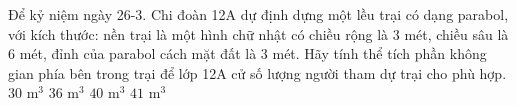 \begin{ex}%
	Để kỷ niệm ngày 26-3. Chi đoàn 12A dự định dựng một lều trại có dạng parabol, với kích thước: nền trại là một hình chữ nhật có chiều rộng là $3$ mét, chiều sâu là $6$ mét, đỉnh của parabol cách mặt đất là $3$ mét. Hãy tính thể tích phần không gian phía bên trong trại để lớp 12A cử số lượng người tham dự trại cho phù hợp.
	\choice
	{ $30$ m$^3$}
	{\True $36$ m$^3$}
	{ $40$ m$^3$}
	{ $41$ m$^3$}
\end{ex}
